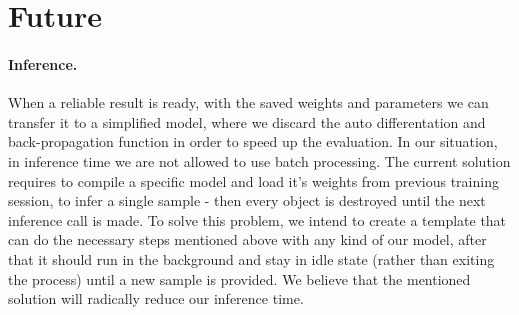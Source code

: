 \section{Future}

\paragraph{Inference.}
When a reliable result is ready, with the saved weights and parameters we can transfer it to a simplified model, where we discard the auto differentation and back-propagation function in order to speed up the evaluation.
In our situation, in inference time we are not allowed to use batch processing.
The current solution requires to compile a specific model and load it's weights from previous training session, to infer a single sample - then every object is destroyed until the next inference call is made.
To solve this problem, we intend to create a template that can do the necessary steps mentioned above with any kind of our model, after that it should run in the background and stay in idle state (rather than exiting the process) until a new sample is provided.
We believe that the mentioned solution will radically reduce our inference time.
